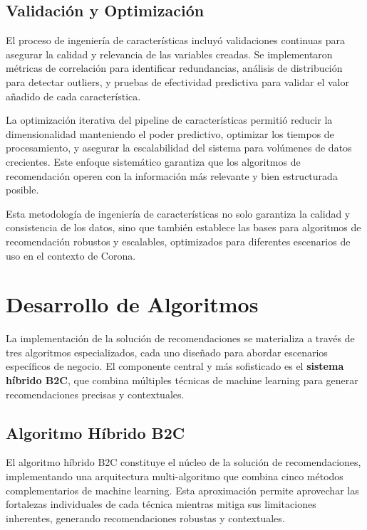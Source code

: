 \documentclass[twocolumn]{article}
\begin{document}
\subsection{Validación y Optimización}

El proceso de ingeniería de características incluyó validaciones continuas para asegurar la calidad y relevancia de las variables creadas. Se implementaron métricas de correlación para identificar redundancias, análisis de distribución para detectar outliers, y pruebas de efectividad predictiva para validar el valor añadido de cada característica.

La optimización iterativa del pipeline de características permitió reducir la dimensionalidad manteniendo el poder predictivo, optimizar los tiempos de procesamiento, y asegurar la escalabilidad del sistema para volúmenes de datos crecientes. Este enfoque sistemático garantiza que los algoritmos de recomendación operen con la información más relevante y bien estructurada posible.

Esta metodología de ingeniería de características no solo garantiza la calidad y consistencia de los datos, sino que también establece las bases para algoritmos de recomendación robustos y escalables, optimizados para diferentes escenarios de uso en el contexto de Corona.

\section{Desarrollo de Algoritmos}

La implementación de la solución de recomendaciones se materializa a través de tres algoritmos especializados, cada uno diseñado para abordar escenarios específicos de negocio. El componente central y más sofisticado es el \textbf{sistema híbrido B2C}, que combina múltiples técnicas de machine learning para generar recomendaciones precisas y contextuales.

\subsection{Algoritmo Híbrido B2C}

El algoritmo híbrido B2C constituye el núcleo de la solución de recomendaciones, implementando una arquitectura multi-algoritmo que combina cinco métodos complementarios de machine learning. Esta aproximación permite aprovechar las fortalezas individuales de cada técnica mientras mitiga sus limitaciones inherentes, generando recomendaciones robustas y contextuales.
\end{document}
